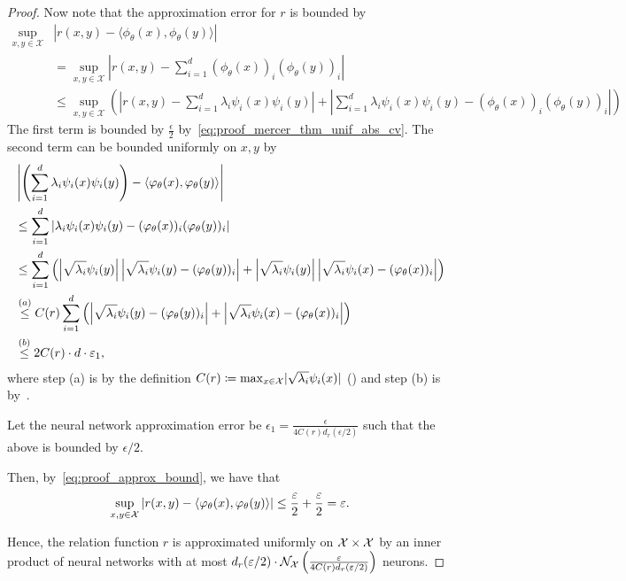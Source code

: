 \begin{proof}
	Now note that the approximation error for \(r\) is bounded by
	\begin{equation}\label{eq:proof_approx_bound}
		\begin{split}
			\sup_{x, y \in \mathcal{X}}&{
				\left\lvert r(x,y) - \langle \phi_\theta(x), \phi_\theta(y) \rangle \right\rvert}\\
			&= \sup_{x, y \in \mathcal{X}}{
				\left\lvert r(x,y) - \sum_{i=1}^{d}{(\phi_\theta(x))_i (\phi_\theta(y))_i} \right\rvert} \\
			&\leq \sup_{x,y \in \mathcal{X}}{ \left(
				\left\lvert r(x,y) - \sum_{i=1}^{d}{\lambda_i \psi_i(x) \psi_i(y)} \right\rvert
				+ \left\lvert \sum_{i=1}^{d}{\lambda_i \psi_i(x) \psi_i(y) - (\phi_\theta(x))_i (\phi_\theta(y))_i} \right\rvert  \right) }
		\end{split}
	\end{equation}
	The first term is bounded by \(\frac{\epsilon}{2}\) by~\eqref{eq:proof_mercer_thm_unif_abs_cv}. The second term can be bounded uniformly on \(x,y\) by
	\begin{equation*}
		\begin{split}
			&\left\lvert \left(\sum_{i=1}^{d}{\lambda_i \psi_i(x) \psi_i(y)}\right) - \langle \phi_\theta(x), \phi_\theta(y) \rangle \right\rvert  \\
			&\leq \sum_{i=1}^{d}{ \abs{ \lambda_i \psi_i(x) \psi_i(y) - (\phi_\theta(x))_i (\phi_\theta(y))_i}} \\
			&\leq \sum_{i=1}^{d}{\paren{
				\abs{\sqrt{\lambda_i} \psi_i(y)} \abs{\sqrt{\lambda_i} \psi_i(y) - (\phi_\theta(y))_i}
				+ \abs{\sqrt{\lambda_i} \psi_i(y)} \abs{\sqrt{\lambda_i} \psi_i(x) - (\phi_\theta(x))_i}
				}} \\
			&\stepa{\leq} C(r) \sum_{i=1}^{d}{\paren{
				\abs{\sqrt{\lambda_i} \psi_i(y) - (\phi_\theta(y))_i}
				+ \abs{\sqrt{\lambda_i} \psi_i(x) - (\phi_\theta(x))_i}
				}} \\
			&\stepb{\leq} 2 C(r) \cdot d \cdot \epsilon_1,
		\end{split}
	\end{equation*}
	where step (a) is by the definition $C(r) \coloneqq \max_{x \in {\mathcal{X}}} \lvert \sqrt{\lambda_i} \psi_i(x) \rvert$ () and step (b) is by~.

	Let the neural network approximation error be $\epsilon_1 = \frac{\epsilon}{4 C(r) d_r(\epsilon / 2)}$ such that the above is bounded by $\epsilon / 2$. 

	Then, by~\eqref{eq:proof_approx_bound}, we have that
	\begin{equation*}
		\sup_{x, y \in \mathcal{X}}{
			\abs{r(x,y) - \iprod{\phi_\theta(x)}{\phi_\theta(y)}}} \leq \frac{\epsilon}{2} + \frac{\epsilon}{2} = \epsilon.
	\end{equation*}

	Hence, the relation function $r$ is approximated uniformly on ${\mathcal{X}} \times {\mathcal{X}}$ by an inner product of neural networks with at most $d_r(\varepsilon / 2) \cdot {\mathcal{N}}_{\mathcal{X}}\left(\frac{\varepsilon}{4 C(r) d_r(\varepsilon / 2)}\right)$ neurons.

\end{proof}

